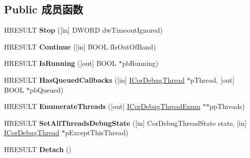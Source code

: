 \subsection*{Public 成员函数}
\begin{DoxyCompactItemize}
\item 
\mbox{\label{interface_i_cor_debug_controller_a2679b0711f9fc3b5df32302704edcc5b}} 
H\+R\+E\+S\+U\+LT {\bfseries Stop} (\mbox{[}in\mbox{]} D\+W\+O\+RD dw\+Timeout\+Ignored)
\item 
\mbox{\label{interface_i_cor_debug_controller_a0809a840adbe17071c72e41904fe8865}} 
H\+R\+E\+S\+U\+LT {\bfseries Continue} (\mbox{[}in\mbox{]} B\+O\+OL f\+Is\+Out\+Of\+Band)
\item 
\mbox{\label{interface_i_cor_debug_controller_a1edb9fa8f9cb52d5358c03b73314ba13}} 
H\+R\+E\+S\+U\+LT {\bfseries Is\+Running} (\mbox{[}out\mbox{]} B\+O\+OL $\ast$pb\+Running)
\item 
\mbox{\label{interface_i_cor_debug_controller_a678b6d4e6aa6d1e865e602ff24126587}} 
H\+R\+E\+S\+U\+LT {\bfseries Has\+Queued\+Callbacks} (\mbox{[}in\mbox{]} \hyperlink{interface_i_cor_debug_thread}{I\+Cor\+Debug\+Thread} $\ast$p\+Thread, \mbox{[}out\mbox{]} B\+O\+OL $\ast$pb\+Queued)
\item 
\mbox{\label{interface_i_cor_debug_controller_a3671304348d842ec6d71e26e060d8032}} 
H\+R\+E\+S\+U\+LT {\bfseries Enumerate\+Threads} (\mbox{[}out\mbox{]} \hyperlink{interface_i_cor_debug_thread_enum}{I\+Cor\+Debug\+Thread\+Enum} $\ast$$\ast$pp\+Threads)
\item 
\mbox{\label{interface_i_cor_debug_controller_a503de392a2680b9514378796422af457}} 
H\+R\+E\+S\+U\+LT {\bfseries Set\+All\+Threads\+Debug\+State} (\mbox{[}in\mbox{]} Cor\+Debug\+Thread\+State state, \mbox{[}in\mbox{]} \hyperlink{interface_i_cor_debug_thread}{I\+Cor\+Debug\+Thread} $\ast$p\+Except\+This\+Thread)
\item 
\mbox{\label{interface_i_cor_debug_controller_a6de4759512c3902d57aff1368df883d1}} 
H\+R\+E\+S\+U\+LT {\bfseries Detach} ()
$$
\end{DoxyCompactItemize}
